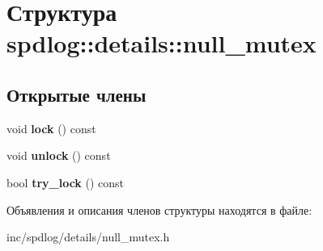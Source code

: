 \hypertarget{structspdlog_1_1details_1_1null__mutex}{}\section{Структура spdlog\+:\+:details\+:\+:null\+\_\+mutex}
\label{structspdlog_1_1details_1_1null__mutex}
\subsection*{Открытые члены}
\begin{DoxyCompactItemize}
\item 
\mbox{\label{structspdlog_1_1details_1_1null__mutex_a086e2d1ca7d4d6b6fae3c0c712876204}} 
void {\bfseries lock} () const
\item 
\mbox{\label{structspdlog_1_1details_1_1null__mutex_ac69dcfda83b4b012f00e55d43107399c}} 
void {\bfseries unlock} () const
\item 
\mbox{\label{structspdlog_1_1details_1_1null__mutex_acc89e7faa648f7b046e6615bffe9025a}} 
bool {\bfseries try\+\_\+lock} () const
\end{DoxyCompactItemize}


Объявления и описания членов структуры находятся в файле\+:\begin{DoxyCompactItemize}
\item 
inc/spdlog/details/null\+\_\+mutex.\+h\end{DoxyCompactItemize}
